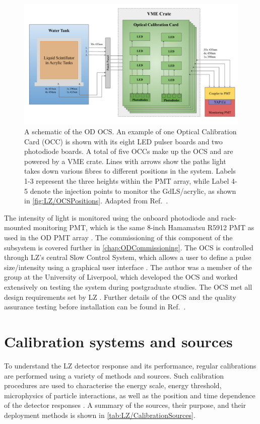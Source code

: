 \begin{figure}[!h]
    \centering
    \includegraphics[width=\linewidth]{figures/LZ/OCSSchematics.pdf}
    \caption[A schematic of the OD OCS. An example of one Optical Calibration Card is shown with its eight LED pulser boards and two photodiode boards.]{A schematic of the OD OCS. An example of one Optical Calibration Card (OCC) is shown with its eight LED pulser boards and two photodiode boards. A total of five OCCs make up the OCS and are powered by a VME crate. Lines with arrows show the paths light takes down various fibres to different positions in the system. Labels 1-3 represent the three heights within the PMT array, while Label 4-5 denote the injection points to monitor the GdLS/acrylic, as shown in \autoref{fig:LZ/OCSPositions}. Adapted from Ref.~\cite{Turner:2021qvi,LZ:2024bsz}.}
    \label{fig:LZ/OCSSchematic}
\end{figure}

The intensity of light is monitored using the onboard photodiode and rack-mounted monitoring PMT, which is the same 8-inch Hamamatsu R5912 PMT as used in the OD PMT array \cite{Turner:2021qvi}. The commissioning of this component of the subsystem is covered further in \autoref{chap:ODCommissioning}. The OCS is controlled through LZ's central Slow Control System, which allows a user to define a pulse size/intensity using a graphical user interface \cite{hbirch:thesis}.
The author was a member of the group at the University of Liverpool, which developed the OCS and worked extensively on testing the system during postgraduate studies. The OCS met all design requirements set by LZ \cite{Turner:2021qvi}. Further details of the OCS and the quality assurance testing before installation can be found in Ref.~\cite{hbirch:thesis,Turner:2021qvi}.


\section{Calibration systems and sources}\label{sec:LZ/CalibrationSources}
To understand the LZ detector response and its performance, regular calibrations are performed using a variety of methods and sources. Such calibration procedures are used to characterise the energy scale, energy threshold, microphysics of particle interactions, as well as the position and time dependence of the detector responses \cite{LZ:2024bsz}. A summary of the sources, their purpose, and their deployment methods is shown in \autoref{tab:LZ/CalibrationSources}.

